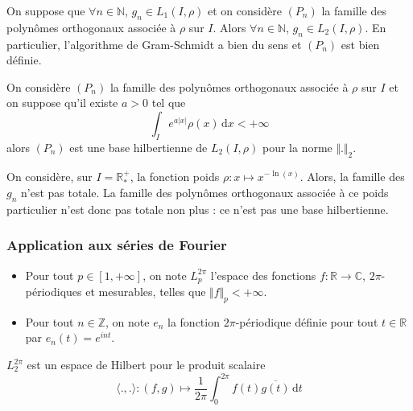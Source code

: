 
	\begin{lemma}
		On suppose que $\forall n \in \mathbb{N}$, $g_n \in L_1(I, \rho)$ et on considère $(P_n)$ la famille des polynômes orthogonaux associée à $\rho$ sur $I$. Alors $\forall n \in \mathbb{N}$, $g_n \in L_2(I, \rho)$. En particulier, l'algorithme de Gram-Schmidt a bien du sens et $(P_n)$ est bien définie.
	\end{lemma}


	\begin{application}
		On considère $(P_n)$ la famille des polynômes orthogonaux associée à $\rho$ sur $I$ et on suppose qu'il existe $a > 0$ tel que
		\[ \int_I e^{a \vert x \vert} \rho(x) \, \mathrm{d}x < +\infty \]
		alors $(P_n)$ est une base hilbertienne de $L_2(I, \rho)$ pour la norme $\Vert . \Vert_2$.
	\end{application}

	\begin{cexample}
		On considère, sur $I = \mathbb{R}^+_*$, la fonction poids $\rho : x \mapsto x^{-\ln(x)}$. Alors, la famille des $g_n$ n'est pas totale. La famille des polynômes orthogonaux associée à ce poids particulier n'est donc pas totale non plus : ce n'est pas une base hilbertienne.
	\end{cexample}

	\subsubsection{Application aux séries de Fourier}


	\begin{notation}
		\begin{itemize}
			\item Pour tout $p \in [1, +\infty]$, on note $L_p^{2\pi}$ l'espace des fonctions $f : \mathbb{R} \rightarrow \mathbb{C}$, $2\pi$-périodiques et mesurables, telles que $\Vert f \Vert_p < +\infty$.
			\item Pour tout $n \in \mathbb{Z}$, on note $e_n$ la fonction $2\pi$-périodique définie pour tout $t \in \mathbb{R}$ par $e_n(t) = e^{int}$.
		\end{itemize}
	\end{notation}

	\begin{proposition}
		$L_2^{2\pi}$ est un espace de Hilbert pour le produit scalaire
		\[ \langle ., . \rangle : (f, g) \mapsto \frac{1}{2 \pi} \int_0^{2\pi} f(t) \overline{g(t)} \, \mathrm{d}t \]
	\end{proposition}

